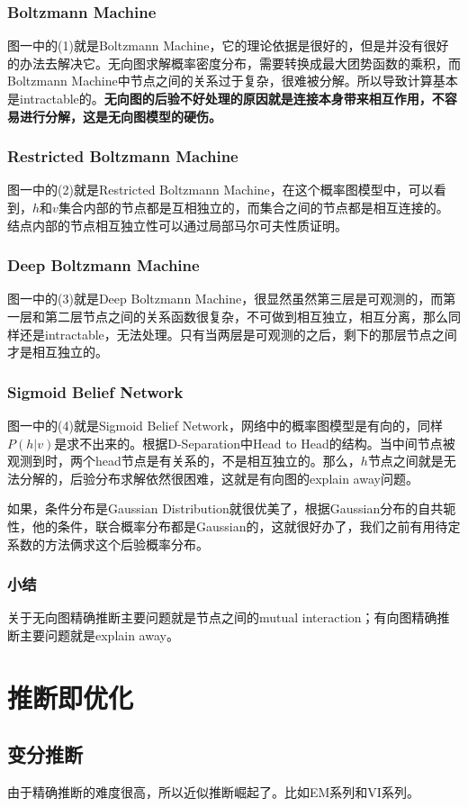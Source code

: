 \documentclass[a4paper]{article}
\begin{document}
\subsubsection{Boltzmann Machine}
图一中的(1)就是Boltzmann Machine，它的理论依据是很好的，但是并没有很好的办法去解决它。无向图求解概率密度分布，需要转换成最大团势函数的乘积，而Boltzmann Machine中节点之间的关系过于复杂，很难被分解。所以导致计算基本是intractable的。\textbf{无向图的后验不好处理的原因就是连接本身带来相互作用，不容易进行分解，这是无向图模型的硬伤。}
\subsubsection{Restricted Boltzmann Machine}
图一中的(2)就是Restricted Boltzmann Machine，在这个概率图模型中，可以看到，$h$和$v$集合内部的节点都是互相独立的，而集合之间的节点都是相互连接的。结点内部的节点相互独立性可以通过局部马尔可夫性质证明。
\subsubsection{Deep Boltzmann Machine}
图一中的(3)就是Deep Boltzmann Machine，很显然虽然第三层是可观测的，而第一层和第二层节点之间的关系函数很复杂，不可做到相互独立，相互分离，那么同样还是intractable，无法处理。只有当两层是可观测的之后，剩下的那层节点之间才是相互独立的。
\subsubsection{Sigmoid Belief Network}
图一中的(4)就是Sigmoid Belief Network，网络中的概率图模型是有向的，同样$P(h|v)$是求不出来的。根据D-Separation中Head to Head的结构。当中间节点被观测到时，两个head节点是有关系的，不是相互独立的。那么，$h$节点之间就是无法分解的，后验分布求解依然很困难，这就是有向图的explain away问题。

如果，条件分布是Gaussian Distribution就很优美了，根据Gaussian分布的自共轭性，他的条件，联合概率分布都是Gaussian的，这就很好办了，我们之前有用待定系数的方法俩求这个后验概率分布。
\subsubsection{小结}
关于无向图精确推断主要问题就是节点之间的mutual interaction；有向图精确推断主要问题就是explain away。

\section{推断即优化}
\subsection{变分推断}
由于精确推断的难度很高，所以近似推断崛起了。比如EM系列和VI系列。
\end{document}
